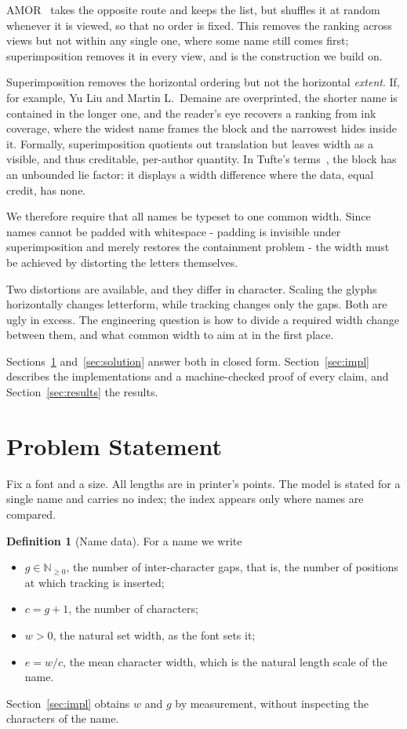 \documentclass[10pt,twocolumn]{article}
\theoremstyle{plain}
\theoremstyle{definition}
\newtheorem{definition}[proposition]{Definition}
\begin{document}
  AMOR~\cite{weiherer2024amor} takes the opposite route and keeps the list, but shuffles it at random whenever it is viewed, so that no order is fixed.
  This removes the ranking across views but not within any single one, where some name still comes first; superimposition removes it in every view, and is the construction we build on.

  Superimposition removes the horizontal ordering but not the horizontal \emph{extent}.
  If, for example, Yu Liu and Martin L.~Demaine are overprinted, the shorter name is contained in the longer one, and the reader's eye recovers a ranking from ink coverage, where the widest name frames the block and the narrowest hides inside it.
  Formally, superimposition quotients out translation but leaves width as a visible, and thus creditable, per-author quantity.
  In Tufte's terms~\cite{tufte1983visual}, the block has an unbounded lie factor: it displays a width difference where the data, equal credit, has none.

  We therefore require that all names be typeset to one common width.
  Since names cannot be padded with whitespace - padding is invisible under superimposition and merely restores the containment problem - the width must be achieved by distorting the letters themselves.

  Two distortions are available, and they differ in character.
  Scaling the glyphs horizontally changes letterform, while tracking changes only the gaps.
  Both are ugly in excess.
  The engineering question is how to divide a required width change between them, and what common width to aim at in the first place.

  Sections~\ref{sec:model} and~\ref{sec:solution} answer both in closed form.
  Section~\ref{sec:impl} describes the implementations and a machine-checked proof of every claim, and Section~\ref{sec:results} the results.

  \section{Problem Statement}
  \label{sec:model}
  Fix a font and a size.
  All lengths are in printer's points.
  The model is stated for a single name and carries no index; the index appears only where names are compared.

  \begin{definition}[Name data]
    For a name we write
    \begin{itemize}
      \item $g \in \mathbb{N}_{\ge 0}$, the number of inter-character gaps, that is,
            the number of positions at which tracking is inserted;
      \item $c = g + 1$, the number of characters;
      \item $w > 0$, the natural set width, as the font sets it;
      \item $e = w / c$, the mean character width, which is the natural length
            scale of the name.
    \end{itemize}
    Section~\ref{sec:impl} obtains $w$ and $g$ by measurement, without inspecting the characters of the name.
  \end{definition}
\end{document}
